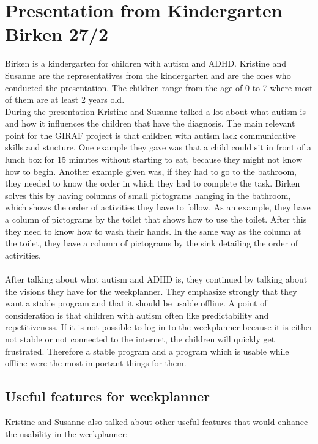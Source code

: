 \section{Presentation from Kindergarten Birken 27/2}
Birken is a kindergarten for children with autism and ADHD.
Kristine and Susanne are the representatives from the kindergarten and are the ones who conducted the presentation.
The children range from the age of 0 to 7 where most of them are at least 2 years old.
\\
During the presentation Kristine and Susanne talked a lot about what autism is and how it influences the children that have the diagnosis.
The main relevant point for the GIRAF project is that children with autism lack communicative skills and stucture. 
One example they gave was that a child could sit in front of a lunch box for 15 minutes without starting to eat, because they might not know how to begin.
Another example given was, if they had to go to the bathroom, they needed to know the order in which they had to complete the task.
Birken solves this by having columns of small pictograms hanging in the bathroom, which shows the order of activities they have to follow. 
As an example, they have a column of pictograms by the toilet that shows how to use the toilet.
After this they need to know how to wash their hands.
In the same way as the column at the toilet, they have a column of pictograms by the sink detailing the order of activities.
\\\\
After talking about what autism and ADHD is, they continued by talking about the visions they have for the weekplanner.
They emphasize strongly that they want a stable program and that it should be usable offline.
A point of consideration is that children with autism often like predictability and repetitiveness. 
If it is not possible to log in to the weekplanner because it is either not stable or not connected to the internet, the children will quickly get frustrated.
Therefore a stable program and a program which is usable while offline were the most important things for them.

\subsection{Useful features for weekplanner}
Kristine and Susanne also talked about other useful features that would enhance the usability in the weekplanner:


